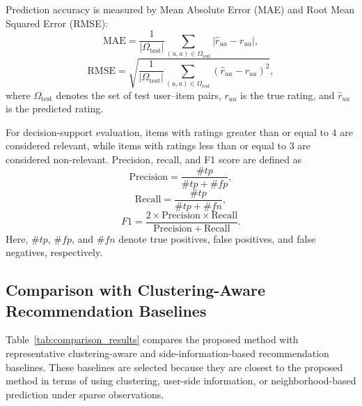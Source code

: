 \documentclass{article}
\theoremstyle{plain}
\theoremstyle{definition}
\theoremstyle{remark}
\begin{document}
Prediction accuracy is measured by Mean Absolute Error (MAE) and Root Mean Squared Error (RMSE):
\begin{equation}
	\label{eq:mae}
	\mathrm{MAE}
	=
	\frac{1}{|\Omega_{\mathrm{test}}|}
	\sum_{(u,a)\in\Omega_{\mathrm{test}}}
	\left|
	\widehat r_{ua}-r_{ua}
	\right|,
\end{equation}
\begin{equation}
	\label{eq:rmse}
	\mathrm{RMSE}
	=
	\sqrt{
		\frac{1}{|\Omega_{\mathrm{test}}|}
		\sum_{(u,a)\in\Omega_{\mathrm{test}}}
		\left(
		\widehat r_{ua}-r_{ua}
		\right)^2
	},
\end{equation}
where \(\Omega_{\mathrm{test}}\) denotes the set of test user--item pairs, \(r_{ua}\) is the true rating, and \(\widehat r_{ua}\) is the predicted rating.

For decision-support evaluation, items with ratings greater than or equal to \(4\) are considered relevant, while items with ratings less than or equal to \(3\) are considered non-relevant. Precision, recall, and F1 score are defined as
\[
\mathrm{Precision}
=
\frac{\#tp}{\#tp+\#fp},
\]
\[
\mathrm{Recall}
=
\frac{\#tp}{\#tp+\#fn},
\]
\[
F1
=
\frac{2\times \mathrm{Precision}\times \mathrm{Recall}}
{\mathrm{Precision}+\mathrm{Recall}}.
\]
Here, \(\#tp\), \(\#fp\), and \(\#fn\) denote true positives, false positives, and false negatives, respectively.

\subsection{Comparison with Clustering-Aware Recommendation Baselines}
\label{subsec:baseline_comparison}

Table~\ref{tab:comparison_results} compares the proposed method with representative clustering-aware and side-information-based recommendation baselines. These baselines are selected because they are closest to the proposed method in terms of using clustering, user-side information, or neighborhood-based prediction under sparse observations.
\end{document}
